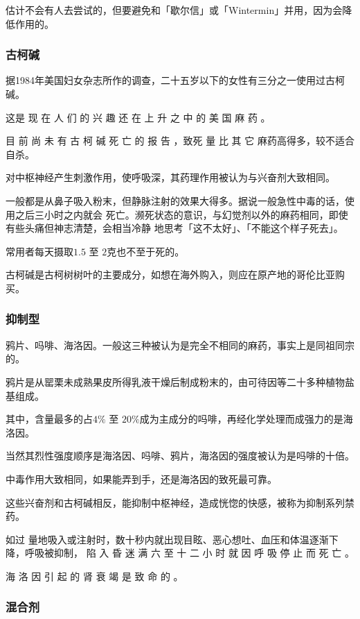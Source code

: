 \documentclass[UTF8]{ctexart}
\begin{document}
估计不会有人去尝试的，但要避免和「歇尔信」或「Wintermin」并用，因为会降低作用的。

\subsubsection*{古柯碱}

据1984年美国妇女杂志所作的调查，二十五岁以下的女性有三分之一使用过古柯碱。

这是 现 在 人 们 的 兴 趣 还 在 上 升 之 中 的 美 国 麻 药 。

目 前 尚 未 有 古 柯 碱 死 亡 的 报 告 ，致死 量 比 其 它 麻药高得多，较不适合自杀。

对中枢神经产生刺激作用，使呼吸深，其药理作用被认为与兴奋剂大致相同。

一般都是从鼻子吸入粉末，但静脉注射的效果大得多。据说一般急性中毒的话，使用之后三小时之内就会
死亡。濒死状态的意识，与幻觉剂以外的麻药相同，即使有些头痛但神志清楚，会相当冷静
地思考「这不太好」、「不能这个样子死去」。

常用者每天摄取$1.5$ 至 $2$克也不至于死的。

古柯碱是古柯树树叶的主要成分，如想在海外购入，则应在原产地的哥伦比亚购买。

\subsubsection*{抑制型}

鸦片、吗啡、海洛因。一般这三种被认为是完全不相同的麻药，事实上是同祖同宗的。

鸦片是从罂栗未成熟果皮所得乳液干燥后制成粉末的，由可待因等二十多种植物盐基组成。

其中，含量最多的占$4\%$ 至 $20\%$成为主成分的吗啡，再经化学处理而成强力的是海洛因。

当然其烈性强度顺序是海洛因、吗啡、鸦片，海洛因的强度被认为是吗啡的十倍。

中毒作用大致相同，如果能弄到手，还是海洛因的致死最可靠。

这些兴奋剂和古柯碱相反，能抑制中枢神经，造成恍惚的快感，被称为抑制系列禁药。

如过 量地吸入或注射时，数十秒内就出现目眩、恶心想吐、血压和体温逐渐下降，呼吸被抑制， 陷 入 昏 迷 满 六 至 十 二 小 时 就 因 呼 吸 停 止 而 死 亡 。

海 洛 因 引 起 的 肾 衰 竭 是 致 命 的 。

\subsubsection*{混合剂}
\end{document}
